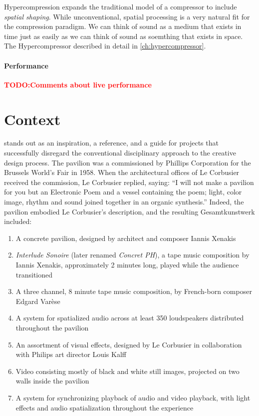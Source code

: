 \documentclass{tufte-book}
\newcommand{\TODO}[1]{\textcolor{red}{\bf TODO:#1}\xspace}
\newcommand{\thesis}{Hypercompression\xspace}
\begin{document}
\thesis expands the traditional model of a compressor to include
\emph{spatial shaping}. While unconventional, spatial processing is a
very natural fit for the compression paradigm. We can think of sound
as a medium that exists in time just as easily as we can think of
sound as soemthing that exists in space. The
Hypercompressor described in detail in \autoref{ch:hypercompressor}.

\paragraph{Performance}
\TODO{Comments about live performance}

\section{Context}
\label{sec:context}

 stands out as an inspiration, a
reference, and a guide for projects that successfully disregard the
conventional disciplinary approach to the creative design process. The
pavilion was a commissioned by Phillips Corporation for the Brussels
World's Fair in 1958.\cite{Zvonar1999} When the architectural offices of
Le Corbusier received the commission, Le Corbusier replied, saying:
``I will not make a pavilion for you but an Electronic Poem and a
vessel containing the poem; light, color image, rhythm and sound
joined together in an organic synthesis.''\cite{Lopez2011} Indeed,
the pavilion embodied Le Corbusier's description, and the resulting
Gesamtkunstwerk included:\cite{Lombardo2009}
\begin{enumerate}
\item A concrete pavilion, designed by architect and composer Iannis
  Xenakis
\item \textit{Interlude Sonoire} (later renamed \textit{Concret PH}), a
  tape music composition by Iannis Xenakis, approximately 2 minutes
  long, played while the audience transitioned
\item A three channel, 8 minute tape music composition, by French-born
  composer Edgard Var\`{e}se
\item A system for spatialized audio across at least 350 loudspeakers
  distributed throughout the pavilion
\item An assortment of visual effects, designed by Le Corbusier in
  collaboration with Philips art director Louis Kalff
\item Video consisting mostly of black and white still images,
  projected on two walls inside the pavilion
\item A system for synchronizing playback of audio and video playback,
  with light effects and audio spatialization throughout the
  experience
\end{enumerate} 
\end{document}
